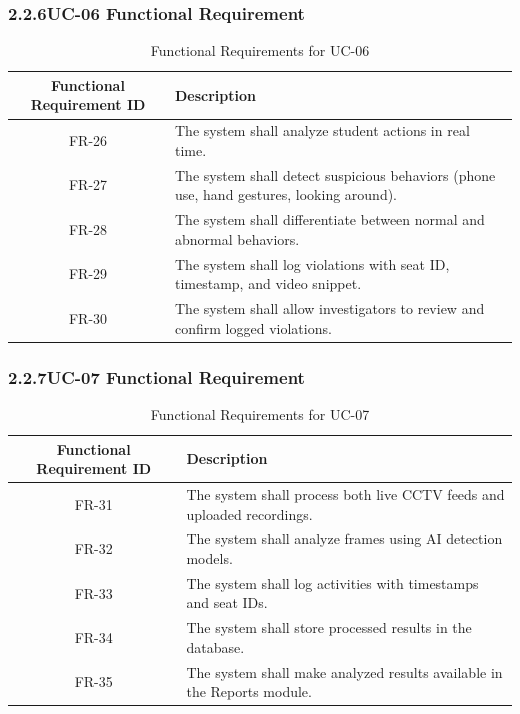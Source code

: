 \subsubsection*{2.2.6\quad UC-06 Functional Requirement}
\vspace{-0.5em}
\begin{table}[H]
\caption{Functional Requirements for UC-06}
\centering
\begin{tabular}{|c|p{11cm}|}
\hline
\textbf{Functional Requirement ID} & \textbf{Description} \\ \hline
FR-26 & The system shall analyze student actions in real time. \\ \hline
FR-27 & The system shall detect suspicious behaviors (phone use, hand gestures, looking around). \\ \hline
FR-28 & The system shall differentiate between normal and abnormal behaviors. \\ \hline
FR-29 & The system shall log violations with seat ID, timestamp, and video snippet. \\ \hline
FR-30 & The system shall allow investigators to review and confirm logged violations. \\ \hline
\end{tabular}
\end{table}

\subsubsection*{2.2.7\quad UC-07 Functional Requirement}
\vspace{-0.5em}
\begin{table}[H]
\caption{Functional Requirements for UC-07}
\centering
\begin{tabular}{|c|p{11cm}|}
\hline
\textbf{Functional Requirement ID} & \textbf{Description} \\ \hline
FR-31 & The system shall process both live CCTV feeds and uploaded recordings. \\ \hline
FR-32 & The system shall analyze frames using AI detection models. \\ \hline
FR-33 & The system shall log activities with timestamps and seat IDs. \\ \hline
FR-34 & The system shall store processed results in the database. \\ \hline
FR-35 & The system shall make analyzed results available in the Reports module. \\ \hline
\end{tabular}
\end{table}

